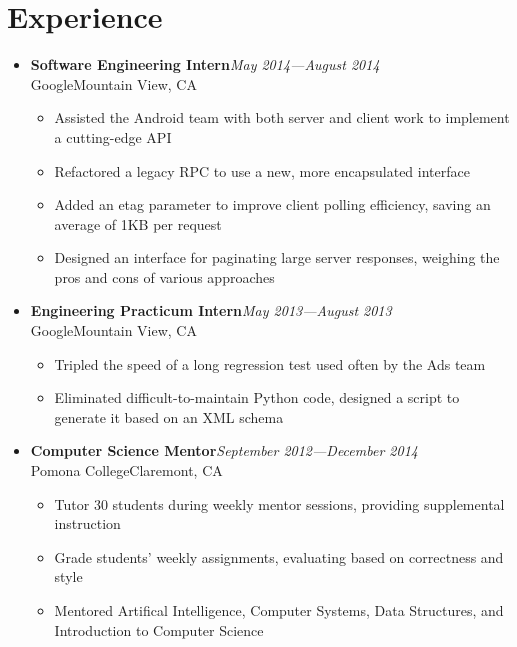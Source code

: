 \documentclass[10pt]{article}
\newcommand\experienceentry[4]{{
        \textbf{#3}\hfill\textit{#4} \\
        #1\hfill#2
}}
\begin{document}
\section*{Experience}
\begin{itemize}[label=,leftmargin=0]
    \item \experienceentry{Google}{Mountain View, CA}
        {Software Engineering Intern}{May 2014---August 2014}
        \begin{itemize}[topsep=4pt]
            \item Assisted the Android team with both server and client work to
                implement a cutting-edge API
            \item Refactored a legacy RPC to use a new, more encapsulated
                interface
            \item Added an etag parameter to improve client polling efficiency,
                saving an average of 1KB per request
            \item Designed an interface for paginating large server responses,
                weighing the pros and cons of various approaches
        \end{itemize}
    \item \experienceentry{Google}{Mountain View, CA}
        {Engineering Practicum Intern}{May 2013---August 2013}
        \begin{itemize}[topsep=4pt]
            \item Tripled the speed of a long regression test used often by the
                Ads team
            \item Eliminated difficult-to-maintain Python code, designed a script
                to generate it based on an XML schema
        \end{itemize}

    \item \experienceentry{Pomona College}{Claremont, CA}
        {Computer Science Mentor}{September 2012---December 2014}
        \begin{itemize}[topsep=4pt]
            \item Tutor 30 students during weekly mentor sessions, providing
                supplemental instruction
            \item Grade students' weekly assignments, evaluating
                based on correctness and style
            \item Mentored Artifical Intelligence, Computer Systems, Data
                Structures, and Introduction to Computer Science
        \end{itemize}
\end{itemize}
\end{document}
